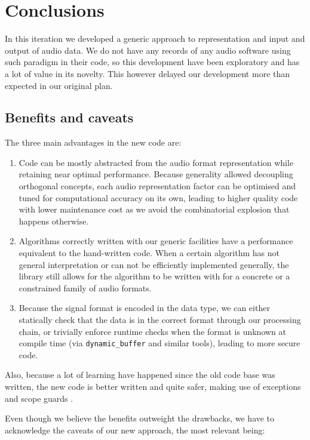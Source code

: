 \section{Conclusions}

In this iteration we developed a generic approach to representation
and input and output of audio data. We do not have any records of
any audio software using such paradigm in their code, so this
development have been exploratory and has a lot of value in its
novelty. This however delayed our development more than expected in
our original plan.

\subsection{Benefits and caveats}

The three main advantages in the new code are:
\begin{enumerate}
\item Code can be mostly abstracted from the audio format
  representation while retaining near optimal performance. Because
  generality allowed decoupling orthogonal concepts, each audio
  representation factor can be optimised and tuned for computational
  accuracy on its own, leading to higher quality code with lower
  maintenance cost as we avoid the combinatorial explosion that
  happens otherwise.

\item Algorithms correctly written with our generic facilities have a
  performance equivalent to the hand-written code. When a certain
  algorithm has not general interpretation or can not be efficiently
  implemented generally, the library still allows for the algorithm to
  be written with for a concrete or a constrained family of audio
  formats.

\item Because the signal format is encoded in the data type, we can
  either statically check that the data is in the correct format
  through our processing chain, or trivially enforce runtime checks
  when the format is unknown at compile time (via
  \texttt{dynamic\_buffer} and similar tools), leading to more secure
  code.
\end{enumerate}

Also, because a lot of learning have happened since the old code base
was written, the new code is better written and quite safer, making
use of exceptions and scope guards \cite{alexandrescu00gener}.

Even though we believe the benefits outweight the drawbacks, we have
to acknowledge the caveats of our new approach, the most relevant
being:

